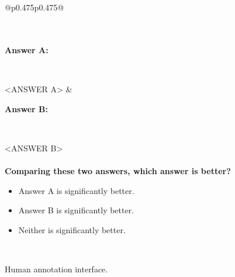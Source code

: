  \begin{figure}[p]
    \scriptsize
    \centering
    \begin{tabular}{@{}p{}p{}@{}}
    \toprule

    \\
    
    \\
    
    \textbf{Answer A:}
    
    ~
    
    <ANSWER A>
    & 

    \textbf{Answer B:}
    
    ~
    
    <ANSWER B>\\
    \\
    \textbf{Comparing these two answers, which answer is better?}
    \begin{itemize}[leftmargin=18pt]
       \item[$\mdblksquare$] Answer A is significantly better.
       \item[$\mdblksquare$] Answer B is significantly better.
       \item[$\mdblksquare$] Neither is significantly better.
    \end{itemize}\\
    \bottomrule
    \end{tabular}
    \caption{Human annotation interface.}
    \label{fig:human_annot}
\end{figure}